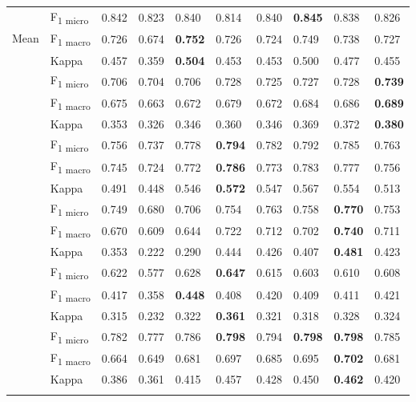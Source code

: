 \begin{table}
\begin{tabular}{ l l l l l l l l l l}
\multirow{3}{*}{Mean} & F\textsubscript{1 micro} & 0.842 & 0.823 & 0.840 & 0.814 & 0.840 & \textbf{0.845} & 0.838 & 0.826 \\
& F\textsubscript{1 macro} & 0.726 & 0.674 & \textbf{0.752} & 0.726 & 0.724 & 0.749 & 0.738 & 0.727 \\
& Kappa & 0.457 & 0.359 & \textbf{0.504} & 0.453 & 0.453 & 0.500 & 0.477 & 0.455 \\ \addlinespace[2ex]
\multirow{3}{*}{Controversial} & F\textsubscript{1 micro} & 0.706 & 0.704 & 0.706 & 0.728 & 0.725 & 0.727 & 0.728 & \textbf{0.739} \\
& F\textsubscript{1 macro} & 0.675 & 0.663 & 0.672 & 0.679 & 0.672 & 0.684 & 0.686 & \textbf{0.689} \\
& Kappa & 0.353 & 0.326 & 0.346 & 0.360 & 0.346 & 0.369 & 0.372 & \textbf{0.380} \\ \addlinespace[2ex]
\multirow{3}{*}{Disagreement} & F\textsubscript{1 micro} & 0.756 & 0.737 & 0.778 & \textbf{0.794} & 0.782 & 0.792 & 0.785 & 0.763 \\
& F\textsubscript{1 macro} & 0.745 & 0.724 & 0.772 & \textbf{0.786} & 0.773 & 0.783 & 0.777 & 0.756 \\
& Kappa & 0.491 & 0.448 & 0.546 & \textbf{0.572} & 0.547 & 0.567 & 0.554 & 0.513 \\ \addlinespace[2ex]
\multirow{3}{*}{Off-topic} & F\textsubscript{1 micro} & 0.749 & 0.680 & 0.706 & 0.754 & 0.763 & 0.758 & \textbf{0.770} & 0.753 \\
& F\textsubscript{1 macro} & 0.670 & 0.609 & 0.644 & 0.722 & 0.712 & 0.702 & \textbf{0.740} & 0.711 \\
& Kappa & 0.353 & 0.222 & 0.290 & 0.444 & 0.426 & 0.407 & \textbf{0.481} & 0.423 \\ \addlinespace[2ex]
\multirow{3}{*}{Sentiment} & F\textsubscript{1 micro} & 0.622 & 0.577 & 0.628 & \textbf{0.647} & 0.615 & 0.603 & 0.610 & 0.608 \\
& F\textsubscript{1 macro} & 0.417 & 0.358 & \textbf{0.448} & 0.408 & 0.420 & 0.409 & 0.411 & 0.421 \\
& Kappa & 0.315 & 0.232 & 0.322 & \textbf{0.361} & 0.321 & 0.318 & 0.328 & 0.324 \\ \addlinespace[2ex]
\midrule
\addlinespace[2ex]
\multirow{3}{*}{Average}  & F\textsubscript{1 micro} & 0.782 & 0.777 & 0.786 & \textbf{0.798} & 0.794 & \textbf{0.798} & \textbf{0.798} & 0.785 \\ & F\textsubscript{1 macro} & 0.664 & 0.649 & 0.681 & 0.697 & 0.685 & 0.695 & \textbf{0.702} & 0.681 \\ & Kappa & 0.386 & 0.361 & 0.415 & 0.457 & 0.428 & 0.450 & \textbf{0.462} & 0.420 \\ \addlinespace[2ex]
\bottomrule
\end{tabular}
\label{tab:res2}
\end{table}


